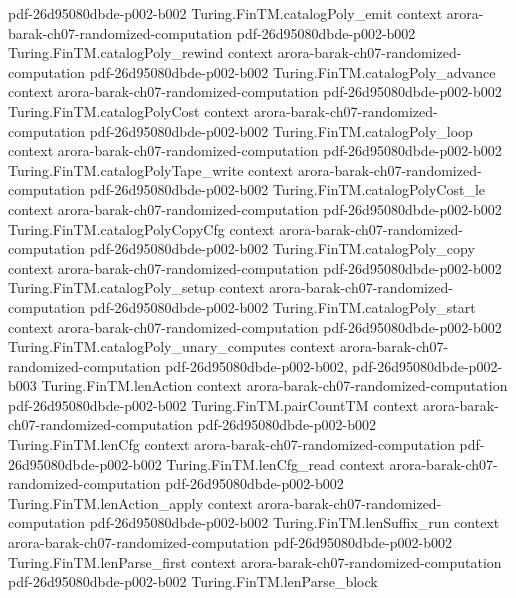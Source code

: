 \begin{theorem}
  {pdf-26d95080dbde-p002-b002}
\proofstep
  {Turing.FinTM.catalogPoly_emit}
  {context}
  {arora-barak-ch07-randomized-computation}
  {pdf-26d95080dbde-p002-b002}
\proofstep
  {Turing.FinTM.catalogPoly_rewind}
  {context}
  {arora-barak-ch07-randomized-computation}
  {pdf-26d95080dbde-p002-b002}
\proofstep
  {Turing.FinTM.catalogPoly_advance}
  {context}
  {arora-barak-ch07-randomized-computation}
  {pdf-26d95080dbde-p002-b002}
\proofstep
  {Turing.FinTM.catalogPolyCost}
  {context}
  {arora-barak-ch07-randomized-computation}
  {pdf-26d95080dbde-p002-b002}
\proofstep
  {Turing.FinTM.catalogPoly_loop}
  {context}
  {arora-barak-ch07-randomized-computation}
  {pdf-26d95080dbde-p002-b002}
\proofstep
  {Turing.FinTM.catalogPolyTape_write}
  {context}
  {arora-barak-ch07-randomized-computation}
  {pdf-26d95080dbde-p002-b002}
\proofstep
  {Turing.FinTM.catalogPolyCost_le}
  {context}
  {arora-barak-ch07-randomized-computation}
  {pdf-26d95080dbde-p002-b002}
\proofstep
  {Turing.FinTM.catalogPolyCopyCfg}
  {context}
  {arora-barak-ch07-randomized-computation}
  {pdf-26d95080dbde-p002-b002}
\proofstep
  {Turing.FinTM.catalogPoly_copy}
  {context}
  {arora-barak-ch07-randomized-computation}
  {pdf-26d95080dbde-p002-b002}
\proofstep
  {Turing.FinTM.catalogPoly_setup}
  {context}
  {arora-barak-ch07-randomized-computation}
  {pdf-26d95080dbde-p002-b002}
\proofstep
  {Turing.FinTM.catalogPoly_start}
  {context}
  {arora-barak-ch07-randomized-computation}
  {pdf-26d95080dbde-p002-b002}
\proofstep
  {Turing.FinTM.catalogPoly_unary_computes}
  {context}
  {arora-barak-ch07-randomized-computation}
  {pdf-26d95080dbde-p002-b002,
    pdf-26d95080dbde-p002-b003}
\proofstep
  {Turing.FinTM.lenAction}
  {context}
  {arora-barak-ch07-randomized-computation}
  {pdf-26d95080dbde-p002-b002}
\proofstep
  {Turing.FinTM.pairCountTM}
  {context}
  {arora-barak-ch07-randomized-computation}
  {pdf-26d95080dbde-p002-b002}
\proofstep
  {Turing.FinTM.lenCfg}
  {context}
  {arora-barak-ch07-randomized-computation}
  {pdf-26d95080dbde-p002-b002}
\proofstep
  {Turing.FinTM.lenCfg_read}
  {context}
  {arora-barak-ch07-randomized-computation}
  {pdf-26d95080dbde-p002-b002}
\proofstep
  {Turing.FinTM.lenAction_apply}
  {context}
  {arora-barak-ch07-randomized-computation}
  {pdf-26d95080dbde-p002-b002}
\proofstep
  {Turing.FinTM.lenSuffix_run}
  {context}
  {arora-barak-ch07-randomized-computation}
  {pdf-26d95080dbde-p002-b002}
\proofstep
  {Turing.FinTM.lenParse_first}
  {context}
  {arora-barak-ch07-randomized-computation}
  {pdf-26d95080dbde-p002-b002}
\proofstep
  {Turing.FinTM.lenParse_block}

\end{theorem}
